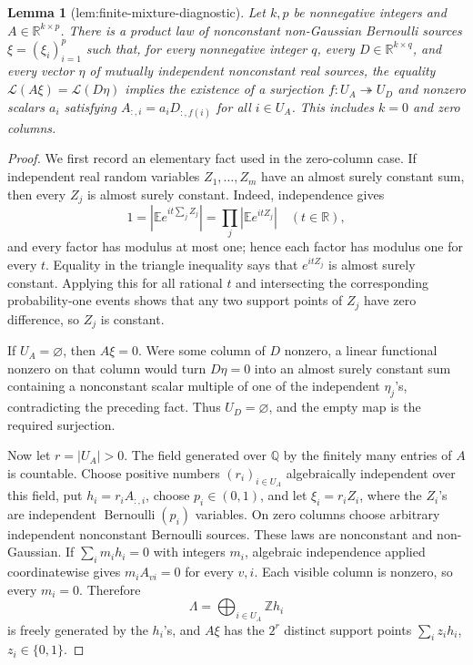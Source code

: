 \documentclass{article}
\newtheorem{lemma}{Lemma}
\begin{document}
\begin{lemma}[lem:finite-mixture-diagnostic]\label{lem:finite-mixture-diagnostic}
Let \(k,p\) be nonnegative integers and \(A\in\mathbb R^{k\times p}\). There is a product law of nonconstant non-Gaussian Bernoulli sources \(\xi=(\xi_i)_{i=1}^p\) such that, for every nonnegative integer \(q\), every \(D\in\mathbb R^{k\times q}\), and every vector \(\eta\) of mutually independent nonconstant real sources, the equality \(\mathcal L(A\xi)=\mathcal L(D\eta)\) implies the existence of a surjection \(f:U_A\twoheadrightarrow U_D\) and nonzero scalars \(a_i\) satisfying \(A_{:,i}=a_iD_{:,f(i)}\) for all \(i\in U_A\). This includes \(k=0\) and zero columns.
\end{lemma}
\begin{proof}
We first record an elementary fact used in the zero-column case. If independent real random variables \(Z_1,\ldots,Z_m\) have an almost surely constant sum, then every \(Z_j\) is almost surely constant. Indeed, independence gives
\[
1=\left|\mathbb E e^{it\sum_jZ_j}\right|=\prod_j\left|\mathbb E e^{itZ_j}\right|\quad(t\in\mathbb R),
\]
and every factor has modulus at most one; hence each factor has modulus one for every \(t\). Equality in the triangle inequality says that \(e^{itZ_j}\) is almost surely constant. Applying this for all rational \(t\) and intersecting the corresponding probability-one events shows that any two support points of \(Z_j\) have zero difference, so \(Z_j\) is constant.

If \(U_A=\varnothing\), then \(A\xi=0\). Were some column of \(D\) nonzero, a linear functional nonzero on that column would turn \(D\eta=0\) into an almost surely constant sum containing a nonconstant scalar multiple of one of the independent \(\eta_j\)'s, contradicting the preceding fact. Thus \(U_D=\varnothing\), and the empty map is the required surjection.

Now let \(r=|U_A|>0\). The field generated over \(\mathbb Q\) by the finitely many entries of \(A\) is countable. Choose positive numbers \((r_i)_{i\in U_A}\) algebraically independent over this field, put \(h_i=r_iA_{:,i}\), choose \(p_i\in(0,1)\), and let \(\xi_i=r_iZ_i\), where the \(Z_i\)'s are independent \(\operatorname{Bernoulli}(p_i)\) variables. On zero columns choose arbitrary independent nonconstant Bernoulli sources. These laws are nonconstant and non-Gaussian. If \(\sum_i m_ih_i=0\) with integers \(m_i\), algebraic independence applied coordinatewise gives \(m_iA_{vi}=0\) for every \(v,i\). Each visible column is nonzero, so every \(m_i=0\). Therefore
\[
\Lambda=\bigoplus_{i\in U_A}\mathbb Z h_i
\]
is freely generated by the \(h_i\)'s, and \(A\xi\) has the \(2^r\) distinct support points \(\sum_i z_ih_i\), \(z_i\in\{0,1\}\).


\end{proof}
\end{document}

